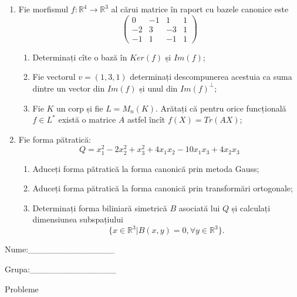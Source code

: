 \documentclass{article}
\begin{document}
\begin{enumerate}
 \item Fie morfismul $f:\mathbb{R}^4 \to \mathbb{R}^3$ al cărui matrice în raport cu bazele canonice este
$$\begin{pmatrix}
0&-1&1&1\\
-2&3&-3&1\\
-1&1&-1&1
\end{pmatrix}$$

\begin{enumerate}
\item Determinați cîte o bază în $Ker(f)$ și $Im(f)$;
\item Fie vectorul $v=(1,3,1)$ determinați descompunerea acestuia ca suma dintre un vector din $Im(f)$ și unul din $Im(f)^\perp$;
\item Fie $K$ un corp și fie $L=M_n(K)$. Arătați că pentru orice funcțională $f \in L^*$ există o matrice $A$ astfel încît $f(X)=Tr(AX)$;
\end{enumerate}
\item Fie forma pătratică:
$$Q= x_1^2-2x_2^2+x_3^2+4x_1x_2-10x_1x_3+4x_2x_3$$

\begin{enumerate}
\item Aduceți forma pătratică la forma canonică prin metoda Gauss;
\item Aduceți forma pătratică la forma canonică prin transformări ortogonale;
\item Determinați forma biliniară simetrică $B$ asociată lui $Q$ și calculați dimensiunea subspațiului
$$\{x \in \mathbb{R}^3 | B(x,y)=0,\forall y \in \mathbb{R}^3\}.$$

\end{enumerate}
\end{enumerate}
\newpage
\begin{flushright}
Nume:\_\_\_\_\_\_\_\_\_\_\_\_\_\_
 
 
Grupa:\_\_\_\_\_\_\_\_\_\_\_\_\_\_
\end{flushright}
\begin{center}
\vspace{2cm}
{\Large Probleme}
\vspace{2cm}
\end{center}
\end{document}
